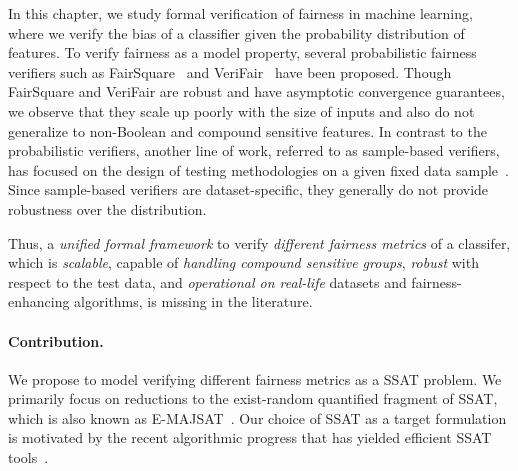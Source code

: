 \label{chapter:justicia}
In this chapter, we study formal verification of fairness in machine learning, where we verify the bias of a classifier given the probability distribution of features. To verify fairness as a model property, several probabilistic fairness verifiers such as FairSquare~\cite{albarghouthi2017fairsquare} and VeriFair~\cite{bastani2019probabilistic} have been proposed. 
Though FairSquare and VeriFair are robust and have asymptotic convergence guarantees, we observe that they scale up poorly with the size of inputs and also do not generalize to non-Boolean and compound sensitive features.
In contrast to the probabilistic verifiers, another line of work, referred to as sample-based verifiers, has focused on the design of testing methodologies  on a given fixed data sample~\cite{galhotra2017fairness,aif360-oct-2018}. 
Since sample-based verifiers are dataset-specific, they generally do not provide robustness over the distribution.


Thus, a \textit{unified formal framework} to verify \textit{different fairness metrics} of a classifer, which is \textit{scalable}, capable of \textit{handling compound sensitive groups}, \textit{robust} with respect to the test data, and \textit{operational on real-life} datasets and fairness-enhancing algorithms, is missing in the literature.

\paragraph{Contribution.} We propose to model verifying different fairness metrics as a SSAT problem.  We primarily focus on reductions to the exist-random quantified fragment of SSAT, which is also known as E-MAJSAT~\cite{littman2001stochastic}.   Our choice of SSAT as a target formulation is motivated by the recent algorithmic progress that has yielded efficient SSAT tools~\cite{lee2017solving,lee2018solving}.



